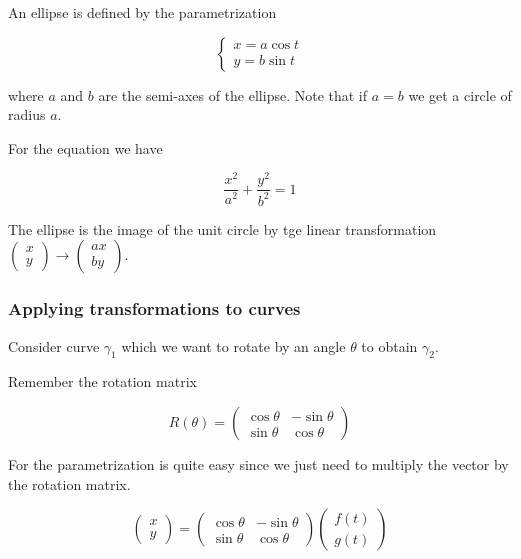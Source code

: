 \documentclass[10pt]{extarticle}
\begin{document}
An ellipse is defined by the parametrization

\[
    \begin{cases}
        x = a \cos t \\
        y = b \sin t
    \end{cases}
\]

where $a$ and $b$ are the semi-axes of the ellipse. Note that if $a = b$ we get a circle of radius $a$.

For the equation we have

$$
    \frac{x^2}{a^2} + \frac{y^2}{b^2} = 1
$$

The ellipse is the image of the unit circle by tge linear transformation $\begin{pmatrix}
        x \\ y
    \end{pmatrix} \to \begin{pmatrix}
        ax \\ by
    \end{pmatrix}$.

\subsubsection{Applying transformations to curves}

Consider curve $\gamma_1$ which we want to rotate by an angle $\theta$ to obtain $\gamma_2$.

Remember the rotation matrix

$$
    R(\theta) = \begin{pmatrix}
        \cos \theta & -\sin \theta \\
        \sin \theta & \cos \theta
    \end{pmatrix}
$$

For the parametrization is quite easy since we just need to multiply the vector by the rotation matrix.

$$
    \begin{pmatrix}
        x \\ y
    \end{pmatrix} = \begin{pmatrix}
        \cos \theta & -\sin \theta \\
        \sin \theta & \cos \theta
    \end{pmatrix} \begin{pmatrix}
        f(t) \\ g(t)
    \end{pmatrix}
$$
\end{document}
